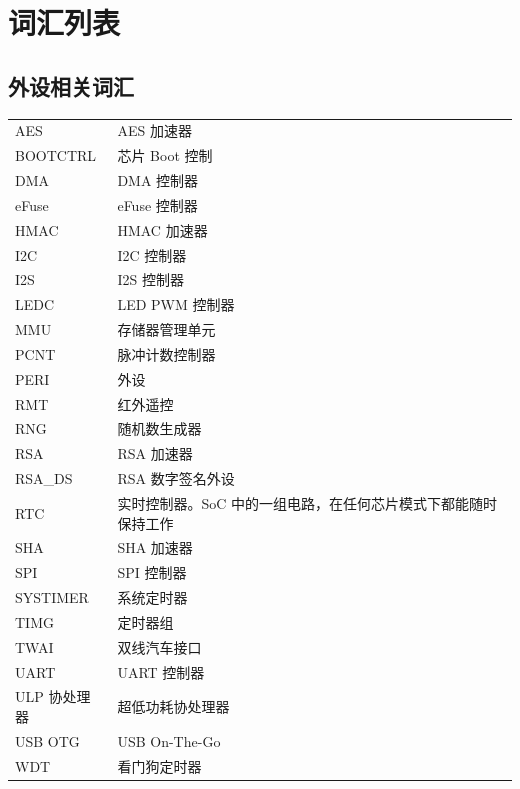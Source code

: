 \section*{词汇列表}\label{glossary}
\rhead{\Navigation}

\subsection*{外设相关词汇}

\begin{longtable}[c]{p{3cm}p{12cm} }

AES & AES 加速器 \\
BOOTCTRL & 芯片 Boot 控制 \\
DMA & DMA 控制器 \\
eFuse & eFuse 控制器 \\
HMAC & HMAC 加速器 \\
I2C & I2C 控制器 \\
I2S & I2S 控制器 \\
LEDC & LED PWM 控制器 \\
MMU & 存储器管理单元 \\
PCNT & 脉冲计数控制器 \\
PERI & 外设 \\
RMT & 红外遥控 \\
RNG & 随机数生成器 \\
RSA & RSA 加速器 \\
RSA\_DS & RSA 数字签名外设 \\
RTC & 实时控制器。SoC 中的一组电路，在任何芯片模式下都能随时保持工作 \\
SHA & SHA 加速器 \\
SPI & SPI 控制器 \\
SYSTIMER & 系统定时器  \\
TIMG & 定时器组 \\
TWAI & 双线汽车接口 \\
UART & UART 控制器 \\
ULP 协处理器 & 超低功耗协处理器\\
USB OTG & USB On-The-Go \\
WDT & 看门狗定时器 \\

\end{longtable}





